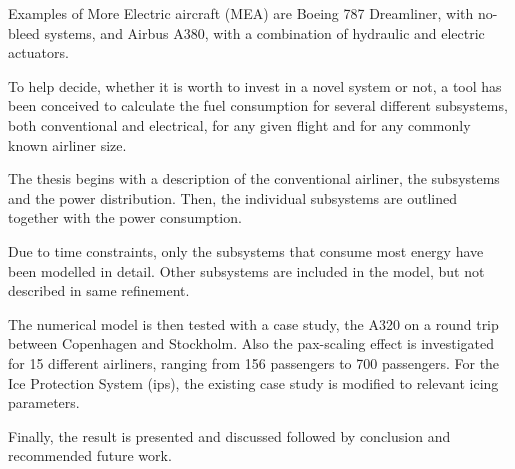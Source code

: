 \documentclass[english]{kththesis}
\begin{document}
Examples of More Electric aircraft (MEA) are Boeing 787 Dreamliner, with no-bleed systems, and Airbus A380, with a combination of hydraulic and electric actuators.

To help decide, whether it is worth to invest in a novel system or not, a tool has been conceived to calculate the fuel consumption for several different subsystems, both conventional and electrical, for any given flight and for any commonly known airliner size.

The thesis begins with a description of the conventional airliner, the subsystems and the power distribution. Then, the individual subsystems are outlined together with the power consumption.

Due to time constraints, only the subsystems that consume most energy have been modelled in detail. Other subsystems are included in the model, but not described in same refinement.

The numerical model is then tested with a case study, the A320 on a round trip between Copenhagen and Stockholm. Also the pax-scaling effect is investigated for 15 different airliners, ranging from 156 passengers to 700 passengers. For the Ice Protection System (\acrshort{ips}), the existing case study is modified to relevant icing parameters.

Finally, the result is presented and discussed followed by conclusion and recommended future work.


%
\end{document}
